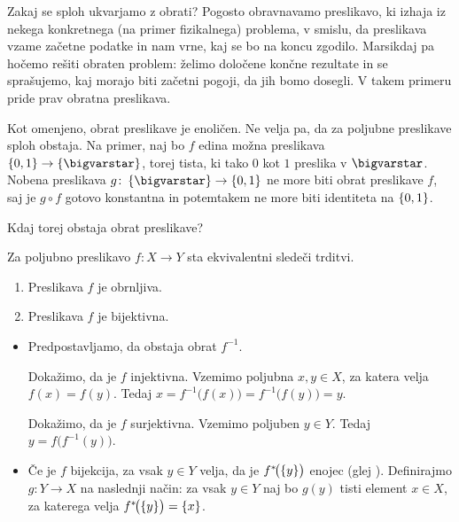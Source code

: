                 Zakaj se sploh ukvarjamo z obrati? Pogosto obravnavamo preslikavo, ki izhaja iz nekega konkretnega (na primer fizikalnega) problema, v smislu, da preslikava vzame začetne podatke in nam vrne, kaj se bo na koncu zgodilo. Marsikdaj pa hočemo rešiti obraten problem: želimo določene končne rezultate in se sprašujemo, kaj morajo biti začetni pogoji, da jih bomo dosegli. V takem primeru pride prav obratna preslikava.

                Kot omenjeno, obrat preslikave je enoličen. Ne velja pa, da za poljubne preslikave sploh obstaja. Na primer, naj bo $f$ edina možna preslikava $\set{0, 1} \to \set{\unit}$, torej tista, ki tako $0$ kot $1$ preslika v $\unit$. Nobena preslikava $g\colon \set{\unit} \to \set{0, 1}$ ne more biti obrat preslikave $f$, saj je $g \circ f$ gotovo konstantna in potemtakem ne more biti identiteta na $\set{0, 1}$.

                Kdaj torej obstaja obrat preslikave?

                \begin{trditev}
                        Za poljubno preslikavo $f\colon X \to Y$ sta ekvivalentni sledeči trditvi.
                        \begin{enumerate}
                                \item
                                        Preslikava $f$ je obrnljiva.
                                \item
                                        Preslikava $f$ je bijektivna.
                        \end{enumerate}
                \end{trditev}

                \begin{dokaz}
                        \begin{itemize}
                                \item{}
                                        Predpostavljamo, da obstaja obrat $f^{-1}$.

                                        Dokažimo, da je $f$ injektivna. Vzemimo poljubna $x, y \in X$, za katera velja $f(x) = f(y)$. Tedaj $x = f^{-1}\big(f(x)\big) = f^{-1}\big(f(y)\big) = y$.

                                        Dokažimo, da je $f$ surjektivna. Vzemimo poljuben $y \in Y$. Tedaj $y = f\big(f^{-1}(y)\big)$.
                                \item{}
                                        Če je $f$ bijekcija, za vsak $y \in Y$ velja, da je $\pim[1]{f}{\set{y}}$ enojec (glej ). Definirajmo $g\colon Y \to X$ na naslednji način: za vsak $y \in Y$ naj bo $g(y)$ tisti element $x \in X$, za katerega velja $\pim[1]{f}{\set{y}} = \set{x}$. 
                        \end{itemize}
                \end{dokaz}

